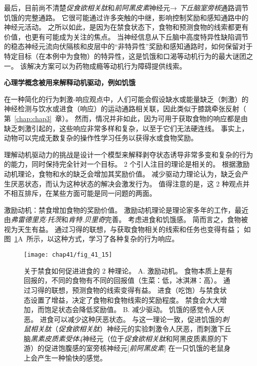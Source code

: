 最后，目前尚不清楚\textit{促食欲相关肽}和\textit{前阿黑皮素}神经元→ \textit{下丘脑室旁核}通路调节饥饿的完整通路。
它很可能通过许多突触的中继，影响控制奖励和感知通路中的神经元活动。
之所以如此，是因为在禁食状态下，食物和预测食物的线索都更有价值，也更有可能成为关注的焦点。
当神经信息从下丘脑中高度特异性缺陷调节的稳态神经元流向伏隔核和皮层中的“非特异性”奖励和感知通路时，如何保留对于特定目标（在本例中为食物）的特异性，这是饥饿和口渴等动机行为的最大谜团之一。
该解决方案可以为药物成瘾等动机行为障碍提供线索。


\textbf{心理学概念被用来解释动机驱动，例如饥饿}

在一种简化的行为刺激-响应观点中，人们可能会假设缺水或能量缺乏（刺激）的神经检测与饮水或进食（响应）的运动通路相关联，因此类似于膝跳牵张反射（ 第~\ref{chap:chap3}~章）。
然而，情况并非如此，因为可用于获取食物的响应都是由缺乏刺激引起的，这些响应非常多样和复杂，以至于它们无法硬连线。
事实上，动物可以完成无数复杂的操作性学习任务以获得水或食物奖励。


理解动机驱动力的挑战是设计一个模型来解释剥夺状态诱导非常多变和复杂的行为的能力，同时保持完全针对一个目标。
2 个引人注目的理论是相关的。
根据激励动机理论，食物和水的缺乏会增加其奖励价值。
减少驱动力理论认为，缺乏会产生厌恶状态，而认为这种状态的解决会激发行为。
值得注意的是，这 2 种观点并不相互排斥，在某些方面可能是同一问题的两面。


激励动机：禁食增加食物的奖励价值。
激励动机理论是理论家多年的工作，最近由\textit{弗雷德里克$\cdot$托茨}和\textit{肯特.贝里奇}完善。
考虑进食和饥饿感。
简而言之，食物被视为天生有益。
通过习得的联想，与获取食物相关的线索和任务也变得有益；
如图~\ref{fig:41_15}A~所示，以这种方式，学习了各种复杂的行为响应。


\begin{figure}[htbp]
	\centering
	\texttt{[image: chap41/fig\_41\_15]}
	\caption{关于禁食如何促进进食的 2 种理论。
		A. 激励动机。
		食物本质上是有回报的，不同的食物有不同的回报值（生菜：低，冰淇淋：高）。
		通过习得的联想，预测食物的线索变得有益。 进食（吃饱）与禁食状态设置了增益，决定了食物和食物线索的奖励程度。
		禁食会大大增加，而饱足状态会降低奖励值。
		B. 减少驱动。
		饥饿的感觉令人厌恶。
		进食可以减少这种厌恶状态。
		与这一理论一致，促进饥饿的\textit{刺鼠相关肽}（\textit{促食欲相关肽}）神经元的实验刺激令人厌恶，而刺激下丘脑\textit{黑素皮质素受体4}神经元（位于\textit{促食欲相关肽}和阿黑皮质素原的下游）的促进饱腹感的室旁核神经元[\textit{前阿黑皮素}] 在一只饥饿的老鼠身上会产生一种愉快的感觉。}
	\label{fig:41_15}
\end{figure}


